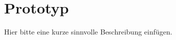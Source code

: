 \section{Prototyp}
\label{sec:prototype}
    Hier bitte eine kurze sinnvolle Beschreibung einfügen.
